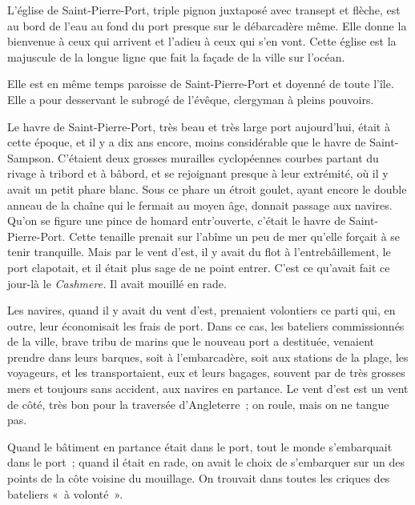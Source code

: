 \documentclass[french,twoside]{book} %
\begin{document}
L’église de Saint-Pierre-Port, triple pignon juxtaposé avec transept et flèche, est au bord de l’eau au fond du port presque sur le débarcadère même. Elle  donne la bienvenue à ceux qui arrivent et l’adieu à ceux qui s’en vont. Cette église est la majuscule de la longue ligne que fait la façade de la ville sur l’océan.\par
Elle est en même temps paroisse de Saint-Pierre-Port et doyenné de toute l’île. Elle a pour desservant le subrogé de l’évêque, clergyman à pleins pouvoirs.\par
Le havre de Saint-Pierre-Port, très beau et très large port aujourd’hui, était à cette époque, et il y a dix ans encore, moins considérable que le havre de Saint-Sampson. C’étaient deux grosses murailles cyclopéennes courbes partant du rivage à tribord et à bâbord, et se rejoignant presque à leur extrémité, où il y avait un petit phare blanc. Sous ce phare un étroit goulet, ayant encore le double anneau de la chaîne qui le fermait au moyen âge, donnait passage aux navires. Qu’on se figure une pince de homard entr’ouverte, c’était le havre de Saint-Pierre-Port. Cette tenaille prenait sur l’abîme un peu de mer qu’elle forçait à se tenir tranquille. Mais par le vent d’est, il y avait du flot à l’entrebâillement, le port clapotait, et il était plus sage de ne point entrer. C’est ce qu’avait fait ce jour-là le \emph{Cashmere.} Il avait mouillé en rade.\par
Les navires, quand il y avait du vent d’est, prenaient volontiers ce parti qui, en outre, leur économisait les frais de port. Dans ce cas, les bateliers commissionnés de la ville, brave tribu de marins que le nouveau port a destituée, venaient prendre dans leurs barques, soit à l’embarcadère, soit aux stations de la plage, les voyageurs, et les transportaient, eux et leurs  bagages, souvent par de très grosses mers et toujours sans accident, aux navires en partance. Le vent d’est est un vent de côté, très bon pour la traversée d’Angleterre ; on roule, mais on ne tangue pas.\par
Quand le bâtiment en partance était dans le port, tout le monde s’embarquait dans le port ; quand il était en rade, on avait le choix de s’embarquer sur un des points de la côte voisine du mouillage. On trouvait dans toutes les criques des bateliers « à volonté ».\par
\end{document}
